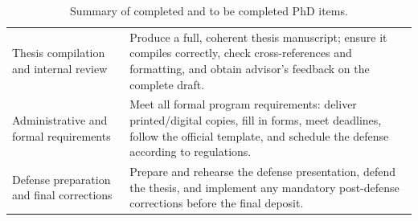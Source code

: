\documentclass[../../infufrgs/ppgc-prop-tese.tex]{subfiles}
\begin{document}
\begin{table}[ht]
\begin{tabular}{p{}p{}}
Thesis compilation and internal review &
Produce a full, coherent thesis manuscript; ensure it compiles correctly, check cross-references and formatting, and obtain advisor’s feedback on the complete draft. \\

Administrative and formal requirements &
Meet all formal program requirements: deliver printed/digital copies, fill in forms, meet deadlines, follow the official template, and schedule the defense according to regulations. \\

Defense preparation and final corrections &
Prepare and rehearse the defense presentation, defend the thesis, and implement any mandatory post-defense corrections before the final deposit. \\
\hline
\end{tabular}
\caption{Summary of completed and to be completed PhD items.}
\end{table}
\end{document}
